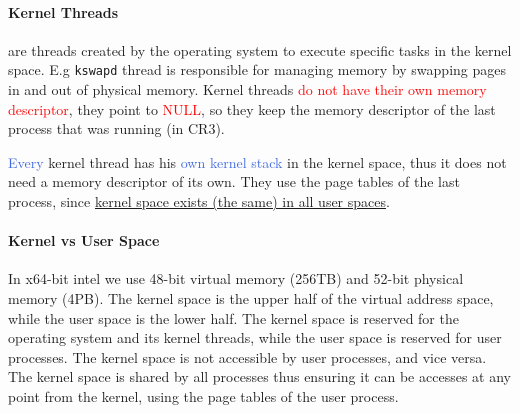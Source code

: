 \documentclass[openany,12pt]{book}
\newcommand{\code}[1]{\texttt{#1}}
\newcommand{\red}[1]{\textcolor{Red}{#1}}
\newcommand{\blue}[1]{\textcolor{RoyalBlue}{#1}}
\begin{document}
\paragraph{Kernel Threads} are threads created by the operating system to execute specific tasks in the kernel space. E.g \code{kswapd} thread is responsible for managing memory by swapping pages in and out of physical memory. Kernel threads \red{do not have their own memory descriptor}, they point to \red{NULL}, so they keep the memory descriptor of the last process that was running (in CR3).

\blue{Every} kernel thread has his \blue{own kernel stack} in the kernel space, thus it does not need a memory descriptor of its own. They use the page tables of the last process, since \ul{kernel space exists (the same) in all user spaces}.


\paragraph{Kernel vs User Space} In x64-bit intel we use 48-bit virtual memory (256TB) and 52-bit physical memory (4PB). The kernel space is the upper half of the virtual address space, while the user space is the lower half. The kernel space is reserved for the operating system and its kernel threads, while the user space is reserved for user processes. The kernel space is not accessible by user processes, and vice versa. The kernel space is shared by all processes thus ensuring it can be accesses at any point from the kernel, using the page tables of the user process.
\end{document}
